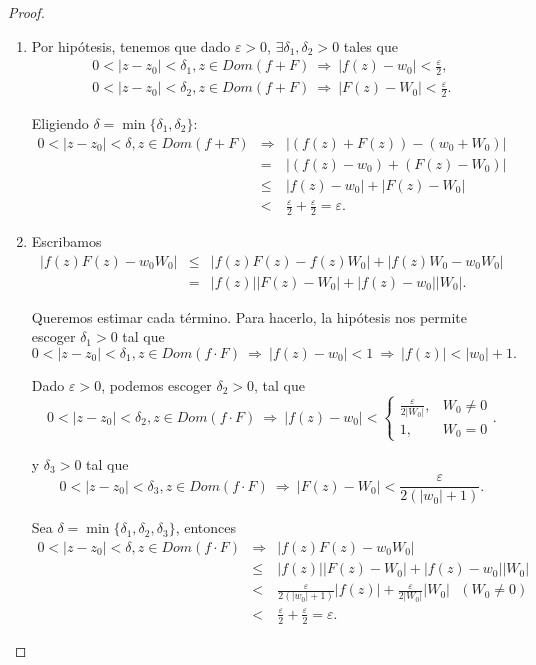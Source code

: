 \begin{proof}
\

\begin{enumerate}

\item Por hipótesis, tenemos que dado $\varepsilon >0$, $\exists \delta_1, \delta_2 >0$ tales que
\begin{eqnarray*}
 0 < |z-z_0| <  \delta_1, z \in Dom(f+F) ~\Rightarrow~ |f(z) - w_0| < \frac{\varepsilon}{2},\\
  0 < |z-z_0| <  \delta_2, z \in Dom(f+F) ~\Rightarrow~ |F(z) - W_0| < \frac{\varepsilon}{2}.
\end{eqnarray*}

Eligiendo $\delta = \min\{ \delta_1, \delta_2 \}$:
\begin{eqnarray*}
  0 < |z-z_0| <  \delta, z \in Dom(f+F)  & \Rightarrow & |(f(z) + F(z)) - (w_0 + W_0)| \\
&= & |(f(z) - w_0) + (F(z) - W_0)| \\
& \leq & |f(z) - w_0| + |F(z) - W_0| \\
&< & \frac{\varepsilon}{2} + \frac{\varepsilon}{2} = \varepsilon.
\end{eqnarray*}

\item Escribamos
\begin{eqnarray*}
|f(z)F(z) - w_0 W_0| &\leq & |f(z)F(z) - f(z)W_0| +|f(z)W_0 - w_0 W_0| \\
&=& |f(z)| |F(z) -W_0| + |f(z) - w_0||W_0|.
\end{eqnarray*}

Queremos estimar cada término. Para hacerlo, la hipótesis nos permite escoger $\delta_1 > 0$ tal que
$$0 < |z-z_0| < \delta_1, z \in Dom(f\cdot F) ~\Rightarrow~ |f(z) -w_0| < 1 ~\Rightarrow~ |f(z)| < |w_0| + 1.$$

Dado $\varepsilon >0$, podemos escoger $\delta_2 > 0$, tal que
$$0 <|z-z_0| < \delta_2, z \in Dom(f\cdot F) ~\Rightarrow~ |f(z)-w_0| < \left\{ \begin{array}{cl}
\frac{\varepsilon}{2 |W_0|},& W_0 \neq 0 \\
1,& W_0 = 0
\end{array} \right. .$$

y $\delta_3 >0$ tal que
$$0 < |z-z_0| < \delta_3,  z \in Dom(f\cdot F)  ~\Rightarrow~ |F(z) -W_0| < \frac{\varepsilon}{2(|w_0| +1)}.$$

Sea $\delta = \min\{\delta_1, \delta_2, \delta_3\}$, entonces
\begin{eqnarray}
0 < |z-z_0| < \delta, z \in Dom(f\cdot F) &\Rightarrow & |f(z)F(z) - w_0 W_0| \nonumber \\
&\leq & |f(z)| |F(z) -W_0| + |f(z) - w_0||W_0| \nonumber \\
&< & \frac{\varepsilon}{2(|w_0| +1)}|f(z)| + \frac{\varepsilon}{2|W_0|} |W_0 | ~~~ (W_0 \neq 0)\label{producto} \\
&< & \frac{\varepsilon}{2} + \frac{\varepsilon}{2} = \varepsilon. \nonumber
\end{eqnarray}


\end{enumerate}
\end{proof}
